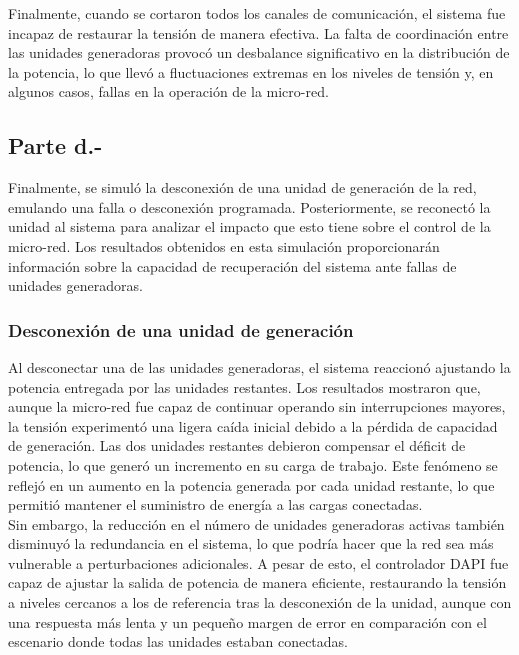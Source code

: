 Finalmente, cuando se cortaron todos los canales de comunicación, el sistema fue incapaz de restaurar la tensión de manera efectiva. La falta de coordinación entre las unidades generadoras provocó un desbalance significativo en la distribución de la potencia, lo que llevó a fluctuaciones extremas en los niveles de tensión y, en algunos casos, fallas en la operación de la micro-red.

\subsection{Parte d.-}

Finalmente, se simuló la desconexión de una unidad de generación de la red, emulando una falla o desconexión programada. Posteriormente, se reconectó la unidad al sistema para analizar el impacto que esto tiene sobre el control de la micro-red. Los resultados obtenidos en esta simulación proporcionarán información sobre la capacidad de recuperación del sistema ante fallas de unidades generadoras.

\subsubsection{Desconexión de una unidad de generación}


Al desconectar una de las unidades generadoras, el sistema reaccionó ajustando la potencia entregada por las unidades restantes. Los resultados mostraron que, aunque la micro-red fue capaz de continuar operando sin interrupciones mayores, la tensión experimentó una ligera caída inicial debido a la pérdida de capacidad de generación. Las dos unidades restantes debieron compensar el déficit de potencia, lo que generó un incremento en su carga de trabajo. Este fenómeno se reflejó en un aumento en la potencia generada por cada unidad restante, lo que permitió mantener el suministro de energía a las cargas conectadas.\\

Sin embargo, la reducción en el número de unidades generadoras activas también disminuyó la redundancia en el sistema, lo que podría hacer que la red sea más vulnerable a perturbaciones adicionales. A pesar de esto, el controlador DAPI fue capaz de ajustar la salida de potencia de manera eficiente, restaurando la tensión a niveles cercanos a los de referencia tras la desconexión de la unidad, aunque con una respuesta más lenta y un pequeño margen de error en comparación con el escenario donde todas las unidades estaban conectadas.

